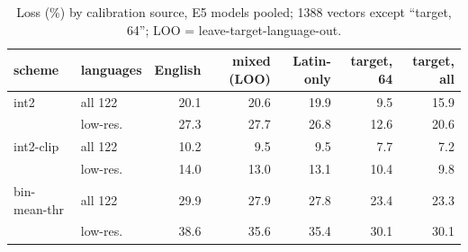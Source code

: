 \begin{table}[t]\centering\footnotesize
\begin{tabular}{llrrrrr}
\toprule
scheme & languages & English & mixed (LOO) & Latin-only & target, 64 & target, all \\
\midrule
int2 & all 122 & 20.1 & 20.6 & 19.9 & 9.5 & 15.9 \\
 & low-res. & 27.3 & 27.7 & 26.8 & 12.6 & 20.6 \\
int2-clip & all 122 & 10.2 & 9.5 & 9.5 & 7.7 & 7.2 \\
 & low-res. & 14.0 & 13.0 & 13.1 & 10.4 & 9.8 \\
bin-mean-thr & all 122 & 29.9 & 27.9 & 27.8 & 23.4 & 23.3 \\
 & low-res. & 38.6 & 35.6 & 35.4 & 30.1 & 30.1 \\
\bottomrule
\end{tabular}
\caption{Loss (\%) by calibration source, E5 models pooled; 1388 vectors except ``target, 64''; LOO = leave-target-language-out.}\label{tab:calib}
\end{table}